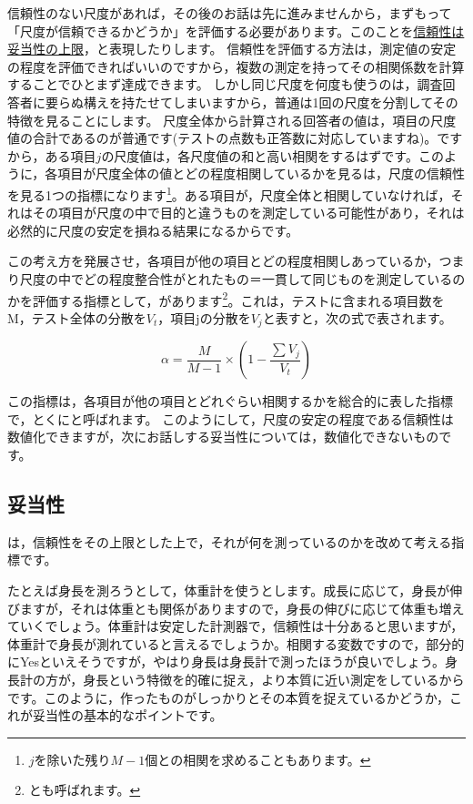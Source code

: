 \documentclass{ltjsbook}
\begin{document}
信頼性のない尺度があれば，その後のお話は先に進みませんから，まずもって「尺度が信頼できるかどうか」を評価する必要があります。このことを\underline{信頼性は妥当性の上限}，と表現したりします。
信頼性を評価する方法は，測定値の安定の程度を評価できればいいのですから，複数の測定を持ってその相関係数を計算することでひとまず達成できます。
しかし同じ尺度を何度も使うのは，調査回答者に要らぬ構えを持たせてしまいますから，普通は1回の尺度を分割してその特徴を見ることにします。
尺度全体から計算される回答者の値は，項目の尺度値の合計であるのが普通です(テストの点数も正答数に対応していますね)。ですから，ある項目$j$の尺度値は，各尺度値の和と高い相関をするはずです。このように，各項目が尺度全体の値とどの程度相関しているかを見るは，尺度の信頼性を見る1つの指標になります\footnote{$j$を除いた残り$M-1$個との相関を求めることもあります。}。ある項目が，尺度全体と相関していなければ，それはその項目が尺度の中で目的と違うものを測定している可能性があり，それは必然的に尺度の安定を損ねる結果になるからです。

この考え方を発展させ，各項目が他の項目とどの程度相関しあっているか，つまり尺度の中でどの程度整合性がとれたもの＝一貫して同じものを測定しているのかを評価する指標として，があります\footnote{とも呼ばれます。}。これは，テストに含まれる項目数をM，テスト全体の分散を$V_t$，項目jの分散を$V_j$と表すと，次の式で表されます。

\[  \alpha =   \frac{M}{M-1} \times \left(1-\frac{\sum V_j}{V_t} \right) \]

この指標は，各項目が他の項目とどれぐらい相関するかを総合的に表した指標で，とくにと呼ばれます。
このようにして，尺度の安定の程度である信頼性は数値化できますが，次にお話しする妥当性については，数値化できないものです。


\subsection{妥当性}
は，信頼性をその上限とした上で，それが何を測っているのかを改めて考える指標です。

たとえば身長を測ろうとして，体重計を使うとします。成長に応じて，身長が伸びますが，それは体重とも関係がありますので，身長の伸びに応じて体重も増えていくでしょう。体重計は安定した計測器で，信頼性は十分あると思いますが，体重計で身長が測れていると言えるでしょうか。相関する変数ですので，部分的にYesといえそうですが，やはり身長は身長計で測ったほうが良いでしょう。身長計の方が，身長という特徴を的確に捉え，より本質に近い測定をしているからです。このように，作ったものがしっかりとその本質を捉えているかどうか，これが妥当性の基本的なポイントです。
\end{document}
